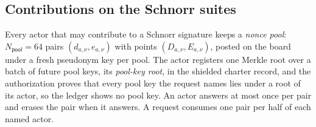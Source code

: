 \subsection{Contributions on the Schnorr suites}\label{sec:contrib}

Every actor that may contribute to a Schnorr signature keeps a \emph{nonce pool}: $N_{\mathsf{pool}} = 64$ pairs $(d_{a,\nu}, e_{a,\nu})$ with points $(D_{a,\nu}, E_{a,\nu})$, posted on the board under a fresh pseudonym key per pool. The actor registers one Merkle root over a batch of future pool keys, its \emph{pool-key root}, in the shielded charter record, and the authorization proves that every pool key the request names lies under a root of its actor, so the ledger shows no pool key. An actor answers at most once per pair and erases the pair when it answers. A request consumes one pair per half of each named actor.

